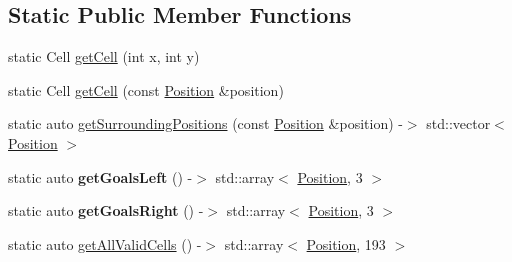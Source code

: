 \subsection*{Static Public Member Functions}
\begin{DoxyCompactItemize}
\item 
static Cell \hyperlink{classgame_model_1_1_environment_a7c095b6202f82cc67d89aa3ec66f387d}{get\-Cell} (int x, int y)
\item 
static Cell \hyperlink{classgame_model_1_1_environment_a71dc1b8596a609a49215beb0d0870489}{get\-Cell} (const \hyperlink{structgame_model_1_1_position}{Position} \&position)
\item 
static auto \hyperlink{classgame_model_1_1_environment_a3eae4f5c6ac23d48c10a6688340b0ba9}{get\-Surrounding\-Positions} (const \hyperlink{structgame_model_1_1_position}{Position} \&position) -\/$>$ std\-::vector$<$ \hyperlink{structgame_model_1_1_position}{Position} $>$
\item 
\hypertarget{classgame_model_1_1_environment_a9718a31bd8e763a69a89028977d3dc5a}{static auto {\bfseries get\-Goals\-Left} () -\/$>$ std\-::array$<$ \hyperlink{structgame_model_1_1_position}{Position}, 3 $>$}\label{classgame_model_1_1_environment_a9718a31bd8e763a69a89028977d3dc5a}

\item 
\hypertarget{classgame_model_1_1_environment_a2614e33c697e1f433338a555b907186b}{static auto {\bfseries get\-Goals\-Right} () -\/$>$ std\-::array$<$ \hyperlink{structgame_model_1_1_position}{Position}, 3 $>$}\label{classgame_model_1_1_environment_a2614e33c697e1f433338a555b907186b}

\item 
static auto \hyperlink{classgame_model_1_1_environment_a13fbde88faea456678ae3471f20b11c2}{get\-All\-Valid\-Cells} () -\/$>$ std\-::array$<$ \hyperlink{structgame_model_1_1_position}{Position}, 193 $>$
\end{DoxyCompactItemize}
